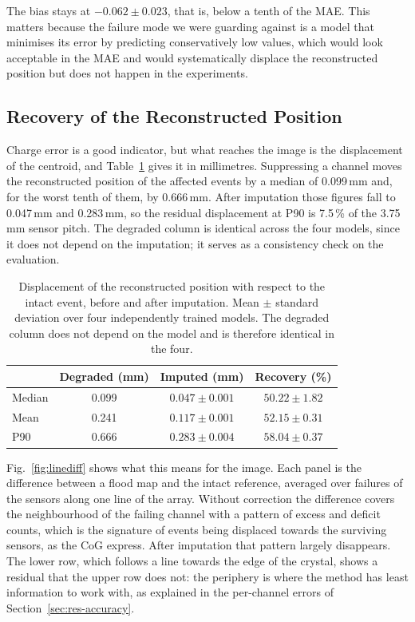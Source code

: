 \documentclass[10pt,conference]{IEEEtran}
\begin{document}
The bias stays at $-0.062 \pm 0.023$, that is, below a tenth of the MAE. This
matters because the failure mode we were guarding against is a model that
minimises its error by predicting conservatively low values, which would look
acceptable in the MAE and would systematically displace the reconstructed
position but does not happen in the experiments. 
\subsection{Recovery of the Reconstructed Position}
\label{sec:res-position}

Charge error is a good indicator, but what reaches the image is the
displacement of the centroid, and Table~\ref{tab:position} gives it in
millimetres. Suppressing a channel moves the reconstructed position of the
affected events by a median of 0.099\,mm and, for the worst tenth of them, by
0.666\,mm. After imputation those figures fall to 0.047\,mm and 0.283\,mm, so
the residual displacement at P90 is 7.5\,\% of the 3.75\,mm sensor pitch. The
degraded column is identical across the four models, since it
does not depend on the imputation; it serves as a consistency check on the
evaluation.

\begin{table}[t]
\centering
\caption{Displacement of the reconstructed position with respect to the intact
event, before and after imputation. Mean $\pm$ standard deviation over four
independently trained models. The degraded column does not depend on the model
and is therefore identical in the four.}
\label{tab:position}
\begin{tabular}{@{}lccc@{}}
\toprule
 & \textbf{Degraded (mm)} & \textbf{Imputed (mm)} & \textbf{Recovery (\%)} \\
\midrule
Median & 0.099 & $0.047 \pm 0.001$ & $50.22 \pm 1.82$ \\
Mean   & 0.241 & $0.117 \pm 0.001$ & $52.15 \pm 0.31$ \\
P90    & 0.666 & $0.283 \pm 0.004$ & $58.04 \pm 0.37$ \\
\bottomrule
\end{tabular}
\end{table}

Fig.~\ref{fig:linediff} shows what this means for the image. Each panel is the
difference between a flood map and the intact reference, averaged over failures
of the sensors along one line of the array. Without correction the difference
covers the neighbourhood of the failing channel with a pattern of excess and
deficit counts, which is the signature of events being displaced towards the
surviving sensors, as the CoG express. After imputation that pattern largely disappears. The lower
row, which follows a line towards the edge of the crystal, shows a residual
that the upper row does not: the periphery is where the method has least
information to work with, as explained in the per-channel errors of
Section~\ref{sec:res-accuracy}.
\end{document}
